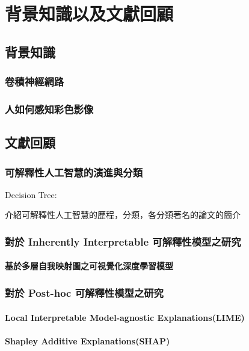 \documentclass[class=NCU_thesis, crop=false]{standalone}
\begin{document}
\chapter{背景知識以及文獻回顧}
\section{背景知識}
\subsection{卷積神經網路}




\subsection{人如何感知彩色影像}


\section{文獻回顧}

\subsection{可解釋性人工智慧的演進與分類}
Decision Tree:
\cite{rokach2016decision}
\cite{grinsztajn2022treebased}

介紹可解釋性人工智慧的歷程，分類，各分類著名的論文的簡介

\subsection{對於 Inherently Interpretable 可解釋性模型之研究}
\subsubsection{基於多層自我映射圖之可視覺化深度學習模型}

\subsection{對於 Post-hoc 可解釋性模型之研究}
\subsubsection{Local Interpretable Model-agnostic Explanations(LIME)} 
\subsubsection{Shapley Additive Explanations(SHAP)}
\end{document}
